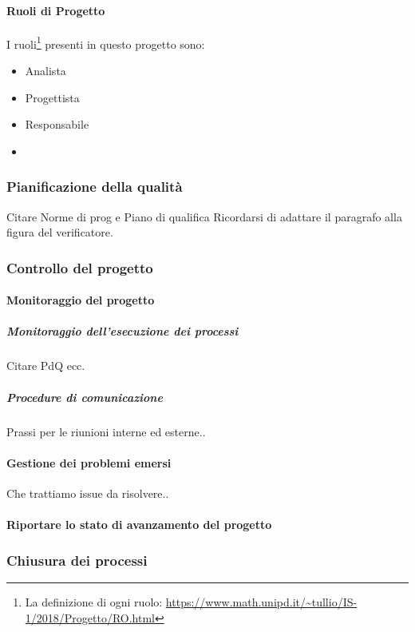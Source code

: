 			\paragraph{Ruoli di Progetto}
			I ruoli\footnote{La definizione di ogni ruolo: \url{https://www.math.unipd.it/~tullio/IS-1/2018/Progetto/RO.html}} presenti in questo progetto sono:
			\begin{itemize}
				\item Analista
				\item Progettista
				\item Responsabile
				\item 
			\end{itemize}
			 
		
		\subsubsection{Pianificazione della qualità}
		Citare Norme di prog e Piano di qualifica
		Ricordarsi di adattare il paragrafo alla figura del verificatore.
		
		\subsubsection{Controllo del progetto}
		
			\paragraph{Monitoraggio del progetto}
			
			\subparagraph{Monitoraggio dell'esecuzione dei processi}
			Citare PdQ ecc.
			
			\subparagraph{Procedure di comunicazione}
    		Prassi per le riunioni interne ed esterne..
    		
    		
    		\paragraph{Gestione dei problemi emersi}
    		Che trattiamo issue da risolvere..
    		
    		\paragraph{Riportare lo stato di avanzamento del progetto}
    		
    		
		\subsubsection{Chiusura dei processi}
		
